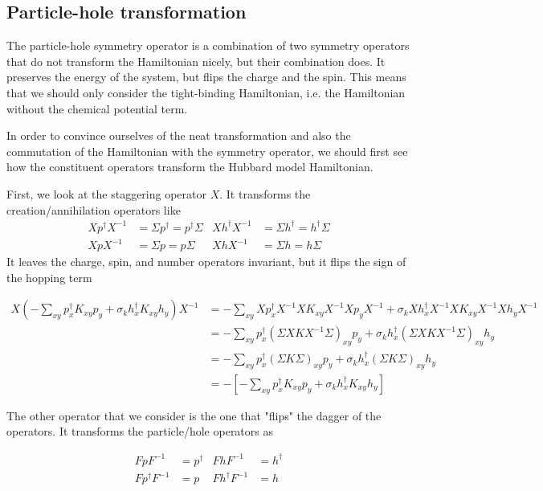 \subsection{Particle-hole transformation}

The particle-hole symmetry operator is a combination of two symmetry operators that do not transform the Hamiltonian nicely, but their combination does. It preserves the energy of the system, but flips the charge and the spin. This means that we should only consider the tight-binding Hamiltonian, i.e. the Hamiltonian without the chemical potential term.

In order to convince ourselves of the neat transformation and also the commutation of the Hamiltonian with the symmetry operator, we should first see how the constituent operators transform the Hubbard model Hamiltonian.

First, we look at the staggering operator $X$. It transforms the creation/annihilation operators like
\begin{align*}
  Xp^\dagger X^{-1} &= \Sigma p^\dagger = p^\dagger \Sigma & Xh^\dagger X^{-1} &= \Sigma h^\dagger = h^\dagger \Sigma \\
  Xp X^{-1} &= \Sigma p = p \Sigma & XhX^{-1} &= \Sigma h = h \Sigma
\end{align*}
It leaves the charge, spin, and number operators invariant, but it flips the sign of the hopping term

\begin{align*}
  X\left( -\sum_{xy} p^\dagger_x K_{xy} p_y + \sigma_k h^\dagger_x K_{xy} h_y\right) X^{-1} &= -\sum_{xy} X p^\dagger_x X^{-1}X K_{xy} X^{-1}X p_y X^{-1} + \sigma_k X h^\dagger_x X^{-1}X K_{xy} X^{-1}X h_y X^{-1}
  \\
  &= -\sum_{xy}  p^\dagger_x (\Sigma X K X^{-1}\Sigma)_{xy} p_y + \sigma_k h^\dagger_x (\Sigma X K X^{-1}\Sigma)_{xy} h_y
  \\
  &= -\sum_{xy}  p^\dagger_x (\Sigma K \Sigma)_{xy} p_y + \sigma_k h^\dagger_x (\Sigma K \Sigma)_{xy} h_y
  \\
  &= -\left[-\sum_{xy} p^\dagger_x K_{xy} p_y + \sigma_k h^\dagger_x K_{xy} h_y \right]
\end{align*}

The other operator that we consider is the one that "flips" the dagger of the operators. It transforms the particle/hole operators as

\begin{align*}
  FpF^{-1} &= p^\dagger & FhF^{-1} &= h^\dagger \\
  Fp^\dagger F^{-1} &= p & Fh^\dagger F^{-1} &= h
\end{align*}

